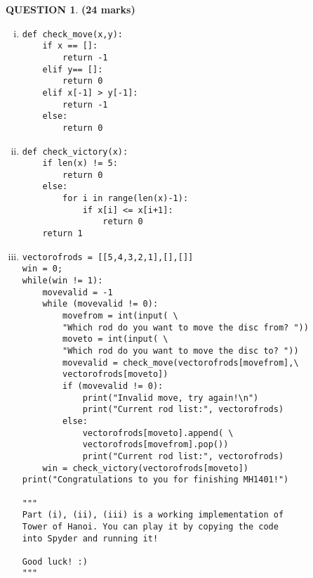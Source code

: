 \documentclass[a4paper,12pt]{article}
\theoremstyle{definition}
\newtheorem{ques}[dummy]{QUESTION}
\theoremstyle{plain}
\newcommand{\py}{python}
\begin{document}
\begin{ques}\hfill \textbf{(24 marks)}\vspace*{1em}
	\begin{enumerate}[(i)]
\item
\begin{verbatim}
def check_move(x,y):
    if x == []:
        return -1
    elif y== []:
        return 0
    elif x[-1] > y[-1]:
        return -1
    else:
        return 0
\end{verbatim}
\item 
\begin{verbatim}
def check_victory(x):
    if len(x) != 5:
        return 0
    else:
        for i in range(len(x)-1):
            if x[i] <= x[i+1]:
                return 0
    return 1
\end{verbatim}
\newpage
\item 
\begin{verbatim} 
vectorofrods = [[5,4,3,2,1],[],[]]
win = 0;
while(win != 1):
    movevalid = -1
    while (movevalid != 0):
        movefrom = int(input( \
        "Which rod do you want to move the disc from? "))
        moveto = int(input( \
        "Which rod do you want to move the disc to? "))
        movevalid = check_move(vectorofrods[movefrom],\
        vectorofrods[moveto])
        if (movevalid != 0):
            print("Invalid move, try again!\n")
            print("Current rod list:", vectorofrods)
        else:
            vectorofrods[moveto].append( \
            vectorofrods[movefrom].pop())
            print("Current rod list:", vectorofrods)
    win = check_victory(vectorofrods[moveto])
print("Congratulations to you for finishing MH1401!")

"""
Part (i), (ii), (iii) is a working implementation of 
Tower of Hanoi. You can play it by copying the code 
into Spyder and running it!

Good luck! :)
"""
\end{verbatim}
	\end{enumerate}
\end{ques}
\end{document}
